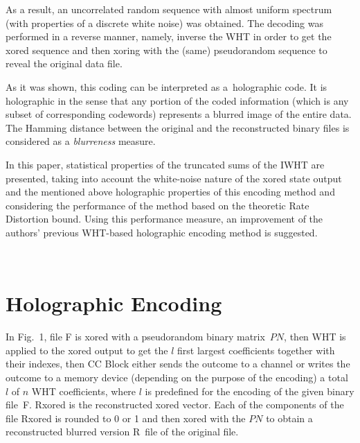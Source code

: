 \begin{multicols}{2}
As a result,  
an uncorrelated random sequence with almost uniform spectrum (with properties of a 
discrete white noise) was obtained. The decoding was performed in a reverse manner, 
namely, inverse the WHT in order to get the xored sequence and then xoring with 
the (same) pseudorandom sequence to reveal the original data file.
{

}

As it was shown, this coding can be interpreted as a~holographic code. It is holographic 
in the sense that any portion of the coded information (which is any subset of 
corresponding codewords) represents a blurred image of the entire data.  The 
Hamming distance between the original and the reconstructed binary files 
is considered as a {\it blurreness} 
measure.

In this paper,  statistical properties of the truncated sums of 
the IWHT are presented, taking into account the white-noise nature of the xored state 
output and the mentioned above holographic properties of this encoding method 
and considering the performance of the method based on the theoretic Rate 
Distortion bound. Using this performance measure,  an improvement of 
the authors' previous WHT-based holographic encoding method is suggested.

\begin{figure*}[b] %
\vspace*{-6pt}
 \begin{center}
 \mbox{%
 \epsfxsize=164.886mm
 }
 \end{center}
 \vspace*{-9pt}
\end{figure*}

\section{Holographic Encoding}


\noindent
In Fig.~1,  file F is xored with a pseudorandom binary matrix~$PN$, 
then WHT is applied to the xored output to get the $l$ first largest coefficients 
together with  their indexes, then CC Block either sends the outcome to a channel 
or writes the outcome to a memory device (depending on the purpose of the encoding) 
a total~$l$ of $n$ WHT coefficients, where $l$ is predefined for the encoding of the 
given binary file~F. Rxored is the reconstructed xored vector. Each of the components 
of the file Rxored is rounded to 0 or 1 and  then xored with the $PN$ to obtain a 
reconstructed  blurred version R~file of the original file.


\end{multicols}
